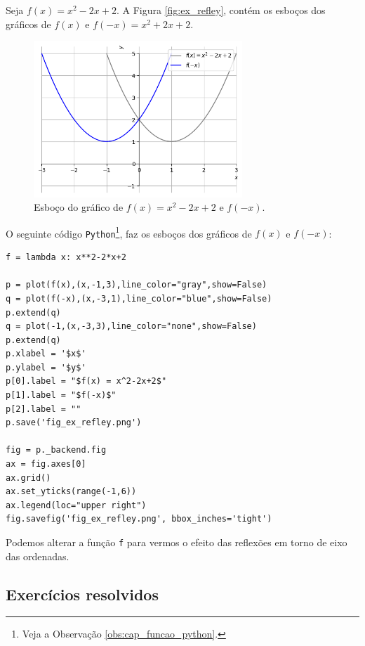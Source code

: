\begin{ex}
  Seja $f(x) = x^2-2x+2$. A Figura \ref{fig:ex_refley}, contém os esboços dos gráficos de $f(x)$ e $f(-x) = x^2+2x+2$.

  \begin{figure}[H]
    \centering
    \includegraphics[width=0.7\textwidth]{./cap_funcao/dados/fig_ex_refley/fig_ex_refley}
    \caption{Esboço do gráfico de $f(x) = x^2-2x+2$ e $f(-x)$.}
    \label{fig:ex_reflex}
  \end{figure}

  \ifispython
  O seguinte código \verb+Python+\footnote{Veja a Observação \ref{obs:cap_funcao_python}.}, faz os esboços dos gráficos de $f(x)$ e $f(-x)$:
\begin{verbatim}
f = lambda x: x**2-2*x+2

p = plot(f(x),(x,-1,3),line_color="gray",show=False)
q = plot(f(-x),(x,-3,1),line_color="blue",show=False)
p.extend(q)
q = plot(-1,(x,-3,3),line_color="none",show=False)
p.extend(q)
p.xlabel = '$x$'
p.ylabel = '$y$'
p[0].label = "$f(x) = x^2-2x+2$"
p[1].label = "$f(-x)$"
p[2].label = ""
p.save('fig_ex_refley.png')

fig = p._backend.fig
ax = fig.axes[0]
ax.grid()
ax.set_yticks(range(-1,6))
ax.legend(loc="upper right")
fig.savefig('fig_ex_refley.png', bbox_inches='tight')
\end{verbatim}
  Podemos alterar a função \verb+f+ para vermos o efeito das reflexões em torno de eixo das ordenadas.
  \fi
\end{ex}

\subsection*{Exercícios resolvidos}

